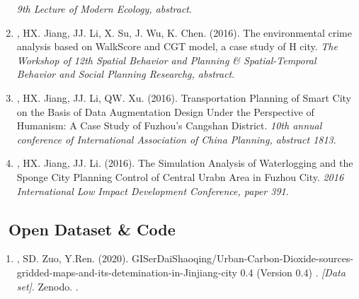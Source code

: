 \begin{enumerate}
    \textit{9th Lecture of Modern Ecology, abstract}.
\item
    \Shaoqing, HX. Jiang, JJ. Li, X. Su, J. Wu, K. Chen. (2016).
    The environmental crime analysis based on WalkScore and CGT model, a case study of H city.
    \textit{The Workshop of 12th Spatial Behavior and Planning \& Spatial-Temporal Behavior and Social Planning Researchg, abstract}.
\item
    \Shaoqing, HX. Jiang, JJ. Li, QW. Xu. (2016).
    Transportation Planning of Smart City on the Basis of Data Augmentation Design Under the Perspective of Humanism: A Case Study of Fuzhou's Cangshan District.
    \textit{10th annual conference of International Association of China Planning, abstract 1813}.
\item
   \Shaoqing, HX. Jiang, JJ. Li. (2016).
    The Simulation Analysis of Waterlogging and the Sponge City Planning Control of Central Urabn Area in Fuzhou City.
    \textit{2016 International Low Impact Development Conference, paper 391}.
\end{enumerate}

\subsection*{\texorpdfstring{\faBook\ Open Dataset \& Code}{Open Dataset \& Code}}
\begin{enumerate}
\item
   \Shaoqing, SD. Zuo, Y.Ren. (2020).
    GISerDaiShaoqing/Urban-Carbon-Dioxide-sources-gridded-maps-and-its-detemination-in-Jinjiang-city 0.4 (Version 0.4) .
    \textit{[Data set]}. Zenodo. 
    .
\end{enumerate}

